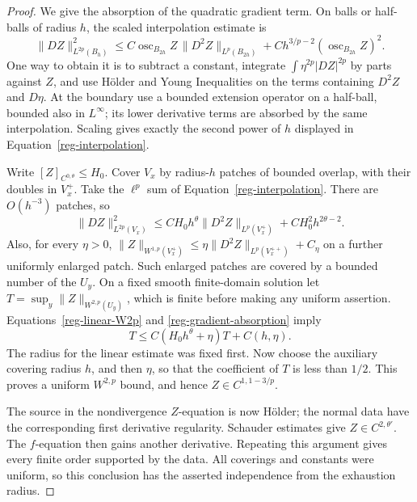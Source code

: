 \begin{proof}
We give the absorption of the quadratic gradient term. On balls
or half-balls of radius $h$, the scaled interpolation estimate is
\begin{equation}
 \|DZ\|_{L^{2p}(B_h)}^2
 \le C\operatorname{osc}_{B_{2h}}Z\,
                 \|D^2Z\|_{L^p(B_{2h})}
       +Ch^{3/p-2}(\operatorname{osc}_{B_{2h}}Z)^2.
 \label{reg-interpolation}
\end{equation}
One way to obtain it is to subtract a constant, integrate
$\int\eta^{2p}|DZ|^{2p}$ by parts against $Z$, and use
H\"older and Young Inequalities on the terms containing $D^2Z$
and $D\eta$. At the boundary use a bounded extension operator
on a half-ball, bounded also in $L^\infty$; its lower derivative
terms are absorbed by the same interpolation. Scaling gives
exactly the second power of $h$ displayed in
Equation~\eqref{reg-interpolation}.

Write $[Z]_{C^{0,\theta}}\le H_0$. Cover $V_x$ by radius-$h$
patches of bounded overlap, with their doubles in $V_x^+$.
Take the $\ell^p$ sum of Equation~\eqref{reg-interpolation}.
There are $O(h^{-3})$ patches, so
\begin{equation}
 \|DZ\|_{L^{2p}(V_x)}^2
 \le CH_0h^\theta\|D^2Z\|_{L^p(V_x^+)}
                         +CH_0^2h^{2\theta-2}.
 \label{reg-gradient-absorption}
\end{equation}
Also, for every $\eta>0$,
$\|Z\|_{W^{1,p}(V_x^+)}
\le\eta\|D^2Z\|_{L^p(V_x^{++})}+C_\eta$
on a further uniformly enlarged patch. Such enlarged patches
are covered by a bounded number of the $U_y$. On a fixed
smooth finite-domain solution let
$T=\sup_y\|Z\|_{W^{2,p}(U_y)}$, which is finite before making
any uniform assertion. Equations~\eqref{reg-linear-W2p} and
\eqref{reg-gradient-absorption} imply
\begin{equation}
 T\le C(H_0h^\theta+\eta)T+C(h,\eta).
 \label{reg-global-absorption}
\end{equation}
The radius for the linear estimate was fixed first. Now choose
the auxiliary covering radius $h$, and then $\eta$, so that the
coefficient of $T$ is less than $1/2$. This proves a uniform
$W^{2,p}$ bound, and hence $Z\in C^{1,1-3/p}$.

The source in the nondivergence $Z$-equation is now H\"older;
the normal data have the corresponding first derivative
regularity. Schauder estimates give $Z\in C^{2,\theta'}$.
The $f$-equation then gains another derivative. Repeating this
argument gives every finite order supported by the data.
All coverings and constants were uniform, so this conclusion
has the asserted independence from the exhaustion radius.
\end{proof}

